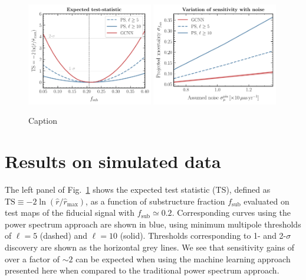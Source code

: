 \documentclass[]{article}
\begin{document}
\begin{figure}[!htbp]
\centering
\includegraphics[width=0.49\textwidth]{figures/TS}
\includegraphics[width=0.49\textwidth]{figures/noise_var}
\caption{Caption}
\label{fig:experiment}
\end{figure}
 

\section{Results on simulated data}
\label{sec:experiments}

The left panel of Fig.~\ref{fig:experiment} shows the expected test statistic (TS), defined as $\mathrm{TS} \equiv -2\ln(\hat r / \hat r_\mathrm{max})$, as a function of substructure fraction $f_\mathrm{sub}$ evaluated on test maps of the fiducial signal with $f_\mathrm{sub} \simeq 0.2$. Corresponding curves using the power spectrum approach are shown in blue, using minimum multipole thresholds of $\ell = 5$ (dashed) and $\ell = 10$ (solid). Thresholds corresponding to 1- and 2-$\sigma$ discovery are shown as the horizontal grey lines. We see that sensitivity gains of over a factor of $\sim 2$ can be expected when using the machine learning approach presented here when compared to the traditional power spectrum approach. 
\end{document}
